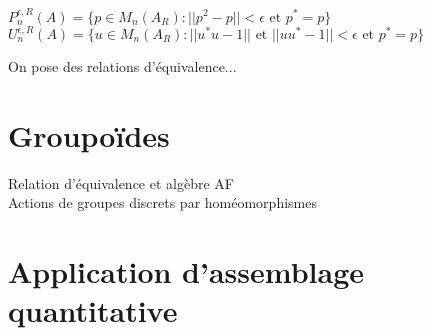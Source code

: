 \begin{definition}
$P_n^{\epsilon,R}(A)=\{p\in M_n(A_R) : ||p^2-p||<\epsilon \text{ et } p^*=p\}$
$U_n^{\epsilon,R}(A)=\{u\in M_n(A_R) : ||u^*u-1|| \text{ et } ||uu^*-1||<\epsilon \text{ et } p^*=p\}$
\end{definition}

On pose des relations d'équivalence...

\section{Groupoïdes}
Relation d'équivalence et algèbre AF\\
Actions de groupes discrets par homéomorphismes

\section{Application d'assemblage quantitative}
